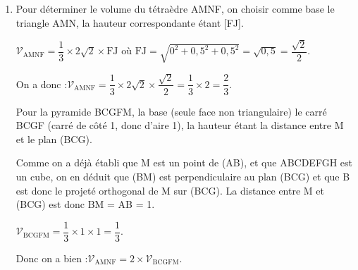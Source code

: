 \documentclass[10pt]{article}
\providecommand{\vectt}[1]{\overrightarrow{\mathrm{#1}}}
\begin{document}
\begin{enumerate}
\begin{enumerate}
			Comme A$(0 ~;~ 0 ~;~ 0)$ est sur (AMN), ses coordonnées doivent vérifier l'équation, donc :

			$0 - 0 + d = 0 \iff d = 0$.

			Finalement, une équation de (AMN) est $y - z = 0$.

			En testant l'appartenance de J à (AMN) :\quad $\begin{aligned}[t] y_{\mathrm{J}} - z_{\mathrm{J}} &= 0,5 - 0,5\\ &= 0
			\end{aligned}$

			Les coordonnées de J vérifient l'équation du plan, donc J appartient au plan (AMN).

			Comme $\vectt{FJ}$ est orthogonal au plan et que J est dans le plan, J est bien le projeté orthogonal de F sur (AMN).
		\end{enumerate}

		\item Pour déterminer le volume du tétraèdre AMNF, on choisir comme base le triangle AMN, la hauteur correspondante étant [FJ].

		$\mathcal{V}_{\mathrm{AMNF}} = \dfrac{1}{3} \times 2\sqrt{2} \times \mathrm{FJ}$ \quad où \quad $\mathrm{FJ} = \sqrt{0^2 + 0,5^2 + 0,5^2} = \sqrt{0,5} = \dfrac{\sqrt{2}}{2}$.

		On a donc :\quad $\mathcal{V}_{\mathrm{AMNF}} = \dfrac{1}{3} \times 2\sqrt{2} \times \dfrac{\sqrt{2}}{2} = \dfrac{1}{3} \times 2 = \dfrac{2}{3}$.

		Pour la pyramide BCGFM, la base (seule face non triangulaire) le carré BCGF (carré de côté 1, donc d'aire 1), la hauteur étant la distance entre M et le plan (BCG).

		Comme on a déjà établi que M est un point de (AB), et que ABCDEFGH est un cube, on en déduit que (BM) est perpendiculaire au plan (BCG) et que B est donc le projeté orthogonal de M sur (BCG). La distance entre M et (BCG) est donc BM = AB = 1.

		$\mathcal{V}_{\mathrm{BCGFM}} = \dfrac{1}{3} \times 1 \times 1 = \dfrac{1}{3}$.

		Donc on a bien :\quad $\mathcal{V}_{\mathrm{AMNF}} = 2 \times \mathcal{V}_{\mathrm{BCGFM}}$.
	\end{enumerate}

	\bigskip
\end{document}
